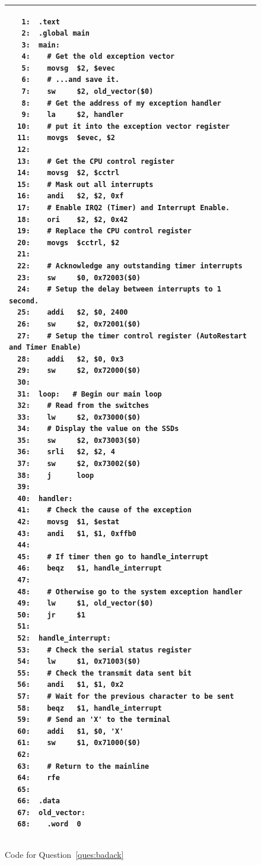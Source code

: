 \documentclass[a4paper,10pt]{article}
\begin{document}
\begin{enumerate}
\begin{figure}[p]
\begin{footnotesize}
\begin{center}
\begin{tabular}{|p{12cm}|}
\hline
\begin{verbatim}
   1:  .text
   2:  .global main
   3:  main:
   4:    # Get the old exception vector
   5:    movsg  $2, $evec
   6:    # ...and save it.
   7:    sw     $2, old_vector($0)
   8:    # Get the address of my exception handler
   9:    la     $2, handler
  10:    # put it into the exception vector register
  11:    movgs  $evec, $2
  12:
  13:    # Get the CPU control register
  14:    movsg  $2, $cctrl
  15:    # Mask out all interrupts
  16:    andi   $2, $2, 0xf
  17:    # Enable IRQ2 (Timer) and Interrupt Enable.
  18:    ori    $2, $2, 0x42
  19:    # Replace the CPU control register
  20:    movgs  $cctrl, $2
  21:    
  22:    # Acknowledge any outstanding timer interrupts
  23:    sw     $0, 0x72003($0)
  24:    # Setup the delay between interrupts to 1 second.
  25:    addi   $2, $0, 2400
  26:    sw     $2, 0x72001($0)
  27:    # Setup the timer control register (AutoRestart and Timer Enable)
  28:    addi   $2, $0, 0x3
  29:    sw     $2, 0x72000($0)
  30:    
  31:  loop:   # Begin our main loop
  32:    # Read from the switches
  33:    lw     $2, 0x73000($0)
  34:    # Display the value on the SSDs
  35:    sw     $2, 0x73003($0)
  36:    srli   $2, $2, 4
  37:    sw     $2, 0x73002($0)
  38:    j      loop
  39:    
  40:  handler:
  41:    # Check the cause of the exception
  42:    movsg  $1, $estat
  43:    andi   $1, $1, 0xffb0
  44:    
  45:    # If timer then go to handle_interrupt
  46:    beqz   $1, handle_interrupt
  47:    
  48:    # Otherwise go to the system exception handler
  49:    lw     $1, old_vector($0)
  50:    jr     $1
  51:    
  52:  handle_interrupt:
  53:    # Check the serial status register
  54:    lw     $1, 0x71003($0)
  55:    # Check the transmit data sent bit
  56:    andi   $1, $1, 0x2
  57:    # Wait for the previous character to be sent
  58:    beqz   $1, handle_interrupt
  59:    # Send an 'X' to the terminal
  60:    addi   $1, $0, 'X'
  61:    sw     $1, 0x71000($0)
  62:    
  63:    # Return to the mainline
  64:    rfe
  65:
  66:  .data
  67:  old_vector:
  68:    .word  0
\end{verbatim}
\\ \hline
\end{tabular}
\end{center}
\end{footnotesize}
\caption{Code for Question~\ref{ques:badack}}
\label{code:badack}
\end{figure}


\end{enumerate}
\end{document}
